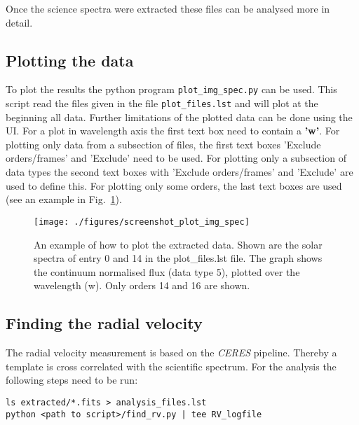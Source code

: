 \documentclass[10pt,a4paper]{article}
\begin{document}
\noindent Once the science spectra were extracted these files can be analysed more in detail. 

\subsection{Plotting the data}

To plot the results the python program \verb|plot_img_spec.py| can be used. This script read the files given in the file \verb|plot_files.lst| and will plot at the beginning all data. Further limitations of the plotted data can be done using the UI. For a plot in wavelength axis the first text box need to contain a \textbf{'w'}. For plotting only data from a subsection of files, the first text boxes 'Exclude orders/frames' and 'Exclude' need to be used. For plotting only a subsection of data types the second text boxes with 'Exclude orders/frames' and 'Exclude' are used to define this. For plotting only some orders, the last text boxes are used (see an example in Fig.~\ref{figure_plotting_results_example}).

\begin{figure} 
  \begin{center}
    \texttt{[image: ./figures/screenshot\_plot\_img\_spec]}
  \end{center} 
  \caption{An example of how to plot the extracted data. Shown are the solar spectra of entry 0 and 14 in the plot\_files.lst file. The graph shows the continuum normalised flux (data type 5), plotted over the wavelength (w). Only orders 14 and 16 are shown.
    \label{figure_plotting_results_example}}
\end{figure}


\subsection{Finding the radial velocity }

\noindent The radial velocity measurement is based on the \textit{CERES} pipeline. Thereby a template is cross correlated with the scientific spectrum. For the analysis the following steps need to be run:
\begin{lstlisting}[style=base]
ls extracted/*.fits > analysis_files.lst
python <path to script>/find_rv.py | tee RV_logfile
\end{lstlisting}
\end{document}

